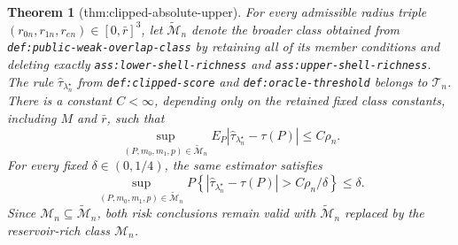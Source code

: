 \documentclass{article}
\newtheorem{theorem}{Theorem}
\begin{document}
\begin{theorem}[thm:clipped-absolute-upper]\label{thm:clipped-absolute-upper}
For every admissible radius triple \((r_{0n},r_{1n},r_{en})\in[0,\bar r]^3\), let \(\widetilde{\mathcal M}_n\) denote the broader class obtained from \texttt{def:public-weak-overlap-class} by retaining all of its member conditions and deleting exactly \texttt{ass:lower-shell-richness} and \texttt{ass:upper-shell-richness}.  The rule \(\widehat\tau_{\lambda_n^{\star}}\) from \texttt{def:clipped-score} and \texttt{def:oracle-threshold} belongs to \(\mathcal T_n\).  There is a constant \(C<\infty\), depending only on the retained fixed class constants, including \(M\) and \(\bar r\), such that
\[
\sup_{(P,m_0,m_1,p)\in\widetilde{\mathcal M}_n}
E_P\!\left|\widehat\tau_{\lambda_n^{\star}}-\tau(P)\right|
\leq C\rho_n.
\]
For every fixed \(\delta\in(0,1/4)\), the same estimator satisfies
\[
\sup_{(P,m_0,m_1,p)\in\widetilde{\mathcal M}_n}
P\!\left\{\left|\widehat\tau_{\lambda_n^{\star}}-\tau(P)\right|
>C\rho_n/\delta\right\}\leq\delta.
\]
Since \(\mathcal M_n\subseteq\widetilde{\mathcal M}_n\), both risk conclusions remain valid with \(\widetilde{\mathcal M}_n\) replaced by the reservoir-rich class \(\mathcal M_n\).
\end{theorem}
\end{document}
